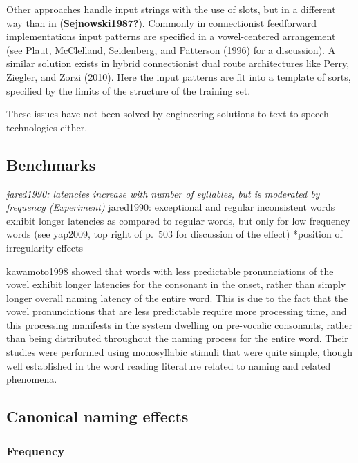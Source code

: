 \documentclass[
  american,
  man,floatsintext]{apa6}
\begin{document}
Other approaches handle input strings with the use of slots, but in a different way than in (\textbf{Sejnowski1987?}). Commonly in connectionist feedforward implementations input patterns are specified in a vowel-centered arrangement (see Plaut, McClelland, Seidenberg, and Patterson (1996) for a discussion). A similar solution exists in hybrid connectionist dual route architectures like Perry, Ziegler, and Zorzi (2010). Here the input patterns are fit into a template of sorts, specified by the limits of the structure of the training set.

These issues have not been solved by engineering solutions to text-to-speech technologies either.

\hypertarget{benchmarks}{%
\subsection{Benchmarks}\label{benchmarks}}

\emph{jared1990: latencies increase with number of syllables, but is moderated by frequency (Experiment)
}jared1990: exceptional and regular inconsistent words exhibit longer latencies as compared to regular words, but only for low frequency words (see yap2009, top right of p.~503 for discussion of the effect)
*position of irregularity effects

kawamoto1998 showed that words with less predictable pronunciations of the vowel exhibit longer latencies for the consonant in the onset, rather than simply longer overall naming latency of the entire word. This is due to the fact that the vowel pronunciations that are less predictable require more processing time, and this processing manifests in the system dwelling on pre-vocalic consonants, rather than being distributed throughout the naming process for the entire word. Their studies were performed using monosyllabic stimuli that were quite simple, though well established in the word reading literature related to naming and related phenomena.

\hypertarget{canonical-naming-effects}{%
\subsection{Canonical naming effects}\label{canonical-naming-effects}}

\hypertarget{frequency}{%
\subsubsection{Frequency}\label{frequency}}
\end{document}
